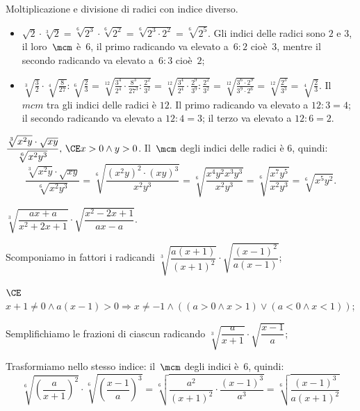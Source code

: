 \begin{exrig}
 \begin{esempio}
Moltiplicazione e divisione di radici con indice diverso.
\begin{itemize}
\item $\sqrt 2\cdot \sqrt[3]2=\sqrt[6]{2^3}\cdot \sqrt[6]{2^2}=\sqrt[6]{2^3\cdot 2^2}=\sqrt[6]{2^5}$. Gli indici delle radici sono $2$ e $3$, il loro~$\mcm$ è~$6$, il primo radicando va elevato a~$6:2$ cioè~$3$, mentre il secondo radicando va elevato a~$6:3$ cioè~$2$;
\item $\sqrt[3]{\frac 3 2}\cdot \sqrt[4]{\frac 8{27}}:\sqrt[6]{\frac 2 3}=\sqrt[12]{\frac{3^4}{2^4}\cdot \frac{8^3}{27^3}:\frac{2^2}{3^2}}=\sqrt[12]{\frac{3^4}{2^4}\cdot \frac{2^9}{3^9}:\frac{2^2}{3^2}}=\sqrt[12]{\frac{3^6\cdot 2^9}{3^9\cdot 2^6}}=\sqrt[12]{\frac{2^3}{3^3}}=\sqrt[4]{\frac 2 3}$. Il~$mcm$ tra gli indici delle radici è $12$. Il primo radicando va elevato a $12:3=4$; il secondo radicando va elevato a $12:4=3$; il terzo va elevato a $12:6=2$.
\end{itemize}
 \end{esempio}

\begin{esempio}
 $\dfrac{\sqrt[3]{x^2y}\cdot \sqrt{xy}}{\sqrt[6]{x^2y^3}},\, \CE x>0\wedge y>0$.
Il~$\mcm$ degli indici delle radici è $6$, quindi:
\[
\frac{\sqrt[3]{x^2y}\cdot \sqrt{\mathit{xy}}}{\sqrt[6]{x^2y^3}}=\sqrt[6]{\frac{\left(x^2y\right)^2\cdot (xy)^3}{x^2y^3}}=\sqrt[6]{\frac{x^4y^2x^3y^3}{x^2y^3}}=\sqrt[6]{\frac{x^7y^5}{x^2y^3}}=\sqrt[6]{x^5y^2}.
\]
\end{esempio}

\begin{esempio}
 $\sqrt[3]{\dfrac{ax+a}{x^2+2x+1}}\cdot \sqrt{\dfrac{x^2-2x+1}{ax-a}}$.
\begin{enumeratea}
\item Scomponiamo in fattori i radicandi $\sqrt[3]{\dfrac{a(x+1)}{(x+1)^2}}\cdot \sqrt{\dfrac{(x-1)^2}{a(x-1)}}$;
\item $\CE$\, $x+1\neq 0\wedge a(x-1)>0\Rightarrow x\neq -1\wedge ((a>0\wedge x>1)\vee (a<0\wedge x<1))$;
\item Semplifichiamo le frazioni di ciascun radicando $\sqrt[3]{\dfrac a{x+1}}\cdot \sqrt{\dfrac{x-1} a}$;
\item Trasformiamo nello stesso indice: il~$\mcm$ degli indici è~$6$, quindi:
\[
\sqrt[6]{\left(\dfrac a{x+1}\right)^2}\cdot \sqrt[6]{\left(\dfrac{x-1} a\right)^3}=\sqrt[6]{\dfrac{a^2}{(x+1)^2}\cdot \dfrac{(x-1)^3}{a^3}}=\sqrt[6]{\dfrac{(x-1)^3}{a(x+1)^2}}
\]
\end{enumeratea}
\end{esempio}


\end{exrig}
